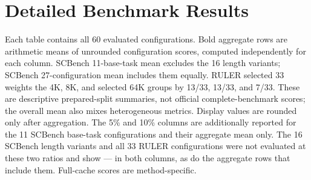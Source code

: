 \section{Detailed Benchmark Results}
\label{app:benchmark-results}

Each table contains all 60 evaluated configurations. Bold aggregate rows are arithmetic means of unrounded configuration scores, computed independently for each column. SCBench 11-base-task mean excludes the 16 length variants; SCBench 27-configuration mean includes them equally. RULER selected 33 weights the 4K, 8K, and selected 64K groups by 13/33, 13/33, and 7/33. These are descriptive prepared-split summaries, not official complete-benchmark scores; the overall mean also mixes heterogeneous metrics. Display values are rounded only after aggregation.
The 5\% and 10\% columns are additionally reported for the 11 SCBench base-task configurations and their aggregate mean only. The 16 SCBench length variants and all 33 RULER configurations were not evaluated at these two ratios and show --- in both columns, as do the aggregate rows that include them.
Full-cache scores are method-specific.

